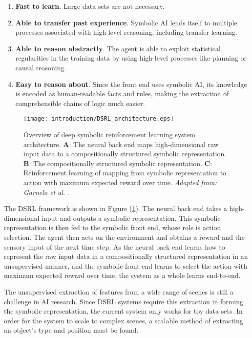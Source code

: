 \begin{enumerate}
\item \textbf{Fast to learn}. Large data sets are not necessary.
\item \textbf{Able to transfer past experience}. Symbolic AI lends itself to multiple processes associated with high-level reasoning, including transfer learning.
\item \textbf{Able to reason abstractly}. The agent is able to exploit statistical regularities in the
training data by using high-level processes like planning or causal reasoning.
\item \textbf{Easy to reason about}. Since the front end uses symbolic AI, its knowledge is encoded as human-readable facts and rules, making the extraction of comprehensible chains of logic much easier.
\end{enumerate}

\begin{figure}[h!]
\centering
\captionsetup{justification=centering}
\texttt{[image: introduction/DSRL\_architecture.eps]}
\caption{Overview of deep symbolic reinforcement learning system architecture. \textbf{A}: The neural back end maps high-dimensional raw input data to a compositionally structured symbolic representation. \textbf{B}: The compositionally structured symbolic representation. \textbf{C}: Reinforcement learning of mapping from symbolic representation to action with maximum expected reward over time. \textit{Adapted from: Garnelo et al.} \cite{Garnelo2016}.}
\label{fig:dsrl_archiecture}
\end{figure}

The DSRL framework is shown in Figure (\ref{fig:dsrl_archiecture}). The neural back end takes a high-dimensional input and outputs a symbolic representation. This symbolic representation is then fed to the symbolic front end, whose role is action selection. The agent then acts on the environment and obtains a reward and the sensory input of the next time step. As the neural back end learns how to represent the raw input data in a compositionally structured representation in an unsupervised manner, and the symbolic front end learns to select the action with maximum expected reward over time, the system as a whole learns end-to-end.

The unsupervised extraction of features from a wide range of scenes is still a challenge in AI research. Since DSRL systems require this extraction in forming the symbolic representation, the current system only works for toy data sets. In order for the system to scale to complex scenes, a scalable method of extracting an object's type and position must be found.


